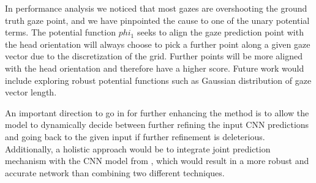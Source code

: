 \documentclass[10pt,twocolumn,letterpaper]{article}
\begin{document}
In performance analysis we noticed that most gazes are overshooting the ground truth gaze point, and we have pinpointed the cause to one of the unary potential terms. The potential function $phi_1$ seeks to align the gaze prediction point with the head orientation will always choose to pick a further point along a given gaze vector due to the discretization of the grid. Further points will be more aligned with the head orientation and therefore have a higher score. Future work would include exploring robust potential functions such as Gaussian distribution of gaze vector length.

An important direction to go in for further enhancing the method is to allow the model to dynamically decide between further refining the input CNN predictions and going back to the given input if further refinement is deleterious. Additionally, a holistic approach would be to integrate joint prediction mechanism with the CNN model from \cite{nips15_recasens}, which would result in a more robust and accurate network than combining two different techniques.

{\small


}
\end{document}

